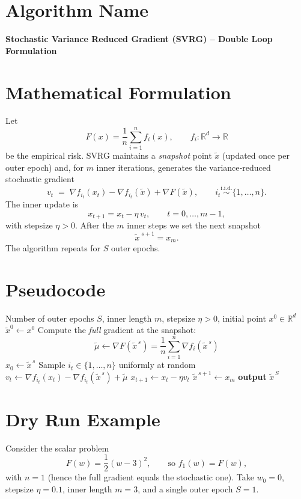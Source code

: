 \documentclass{article}
\begin{document}
\section*{Algorithm Name}
\textbf{Stochastic Variance Reduced Gradient (SVRG) – Double Loop Formulation}

\section*{Mathematical Formulation}
Let 
\[
F(x)=\frac{1}{n}\sum_{i=1}^{n}f_i(x),\qquad f_i:\mathbb{R}^d\to\mathbb{R}
\]
be the empirical risk.  
SVRG maintains a \emph{snapshot} point $\tilde{x}$ (updated once per outer epoch) and, for $m$ inner iterations, generates the variance‑reduced stochastic gradient
\[
v_t \;=\; \nabla f_{i_t}(x_t)-\nabla f_{i_t}(\tilde{x})+\nabla F(\tilde{x}),\qquad i_t\stackrel{\text{i.i.d.}}{\sim}\{1,\dots,n\}.
\]
The inner update is
\[
x_{t+1}=x_t-\eta\, v_t ,\qquad t=0,\dots ,m-1,
\]
with stepsize $\eta>0$.  
After the $m$ inner steps we set the next snapshot
\[
\tilde{x}^{\;s+1}=x_m .
\]
The algorithm repeats for $S$ outer epochs.

\section*{Pseudocode}
\begin{algorithm}[H]
\caption{SVRG (double‑loop)}\label{alg:svrg}
\begin{algorithmic}[1]
\Require Number of outer epochs $S$, inner length $m$, stepsize $\eta>0$, initial point $x^{0}\in\mathbb{R}^d$
\State $\tilde{x}^{0}\gets x^{0}$
    \State Compute the \emph{full} gradient at the snapshot:
    \[
    \tilde{\mu}\gets \nabla F(\tilde{x}^{\,s})=\frac1n\sum_{i=1}^{n}\nabla f_i(\tilde{x}^{\,s})
    \]
    \State $x_0\gets \tilde{x}^{\,s}$
        \State Sample $i_t\in\{1,\dots,n\}$ uniformly at random
        \State $v_t\gets \nabla f_{i_t}(x_t)-\nabla f_{i_t}(\tilde{x}^{\,s})+\tilde{\mu}$
        \State $x_{t+1}\gets x_t-\eta v_t$
    \EndFor
    \State $\tilde{x}^{\,s+1}\gets x_m$
\EndFor
\State \textbf{output} $\tilde{x}^{\,S}$
\end{algorithmic}
\end{algorithm}

\section*{Dry Run Example}
Consider the scalar problem
\[
F(w)=\frac12(w-3)^2,\qquad\text{so }f_1(w)=F(w),
\]
with $n=1$ (hence the full gradient equals the stochastic one).  
Take $w_0=0$, stepsize $\eta=0.1$, inner length $m=3$, and a single outer epoch $S=1$.
\end{document}
